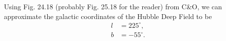 \documentclass[11pt,letterpaper]{article}
\begin{document}
% 
% 
% 
% 

Using Fig. 24.18 (probably Fig. 25.18 for the reader) from C\&O, we can approximate the galactic coordinates of the Hubble Deep Field to be
\begin{align*}
    l &= 225^\circ, \\
    b &= -55^\circ.
\end{align*} 
\end{document}
